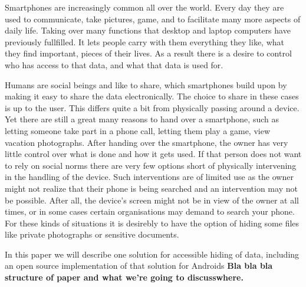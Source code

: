 Smartphones are increasingly common all over the world.
Every day they are used to communicate, take pictures, game, and to facilitate many more aspects of daily life.
Taking over many functions that desktop and laptop computers have previously fullfilled.
It lets people carry with them everything they like, what they find important, pieces of their lives.
As a result there is a desire to control who has access to that data, and what that data is used for.

Humans are social beings and like to share, which smartphones build upon by making it easy to share the data electronically.
The choice to share in these cases is up to the user. 
This differs quite a bit from physically passing around a device.
Yet there are still a great many reasons to hand over a smartphone, such as letting someone take part in a phone call, letting them play a game, view vacation photographs.
After handing over the smartphone, the owner has very little control over what is done and how it gets used.
If that person does not want to rely on social norms there are very few options short of physically intervening in the handling of the device.
Such interventions are of limited use as the owner might not realize that their phone is being searched and an intervention may not be possible.
After all, the device's screen might not be in view of the owner at all times, or in some cases certain organisations may demand to search your phone.
For these kinds of situations it is desirebly to have the option of hiding some files like private photographs or sensitive documents.


In this paper we will describe one solution for accessible hiding of data, including an open source implementation of that solution for Androids
\textbf{Bla bla bla structure of paper and what we're going to discusswhere.}